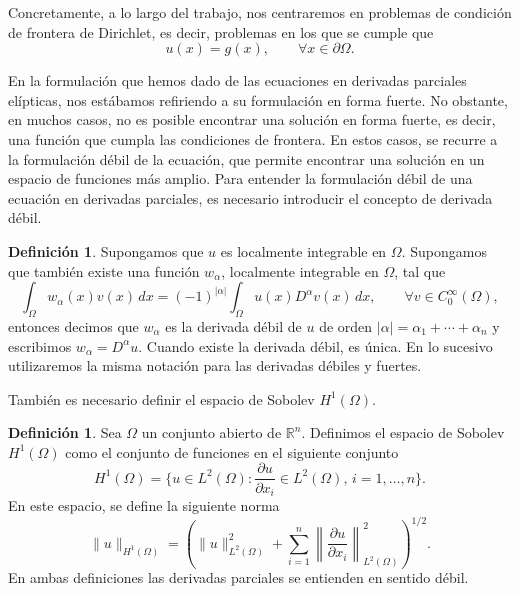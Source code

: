 \documentclass[a4paper,11pt,spanish, twoside, leqno]{tfg-uam}
\theoremstyle{definition}
\newtheorem{defin}[teor]{Definici\'on}
\begin{document}
Concretamente, a lo largo del trabajo, nos centraremos en problemas de condición de frontera de Dirichlet, es decir, problemas en los que se cumple que
\begin{equation}
    u(x) = g(x), \qquad \forall x\in\partial\Omega.
\end{equation}

En la formulación que hemos dado de las ecuaciones en derivadas parciales elípticas, nos estábamos refiriendo a su formulación en forma fuerte. No obstante, en muchos casos, no es posible encontrar una solución en forma fuerte, es decir, una función que cumpla las condiciones de frontera. En estos casos, se recurre a la  formulación débil de la ecuación, que permite encontrar una solución en un espacio de funciones más amplio. Para entender la formulación débil de una ecuación en derivadas parciales, es necesario introducir el concepto de derivada débil.

\begin{mdframed}
    \begin{defin}
        Supongamos que $u$ es localmente integrable en $\Omega$. Supongamos que también existe una función $w_\alpha$, localmente integrable en $\Omega$, tal que
        \begin{equation*}
            \int_\Omega w_\alpha(x)v(x) \, dx = (-1)^{|\alpha|} \int_\Omega u(x)D^\alpha v(x) \, dx, \qquad \forall v \in C_0^\infty(\Omega),
        \end{equation*}
        entonces decimos que $w_\alpha$ es la derivada débil de $u$ de orden $|\alpha| = \alpha_1 + \cdots + \alpha_n$ y escribimos $w_\alpha = D^\alpha u$. Cuando existe la derivada débil, es única. En lo sucesivo utilizaremos la misma notación para las derivadas débiles y fuertes.
    \end{defin}
\end{mdframed}
También es necesario definir el espacio de Sobolev $H^1(\Omega)$.
\begin{mdframed}
\begin{defin}
    Sea $\Omega$ un conjunto abierto de $\mathbb{R}^n$. Definimos el espacio de Sobolev $H^1(\Omega)$ como el conjunto de funciones en el siguiente conjunto
    \begin{equation}
        H^1(\Omega)=\{u\in L^2(\Omega): \frac{\partial u}{\partial x_i}\in L^2(\Omega), \, i=1,\dots,n\}.
    \end{equation}
    En este espacio, se define la siguiente norma
    \begin{equation}
        \|u\|_{H^1(\Omega)}=\left(\|u\|^2_{L^2(\Omega)} + \sum_{i=1}^{n}\left\|\frac{\partial u}{\partial x_i}\right\|^2_{L^2(\Omega)}\right)^{1/2}.
    \end{equation}
    En ambas definiciones las derivadas parciales se entienden en sentido débil.
\end{defin}
\end{mdframed}
    
\end{document}
